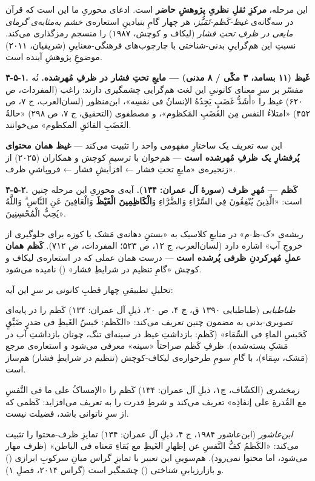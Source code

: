 \documentclass[12pt,a4paper]{article}
\begin{document}
\begin{RTL}
\begin{otherlanguage}{persian}
این مرحله، \textbf{مرکزِ ثقلِ نظریِ پژوهشِ حاضر} است. ادعای محوریِ ما این است
که قرآن در سه‌گانه‌ی \emph{غیظ-کَظم-تَمَیُّز}، هر چهار گامِ بنیادینِ استعاره‌ی
\emph{خشم به‌مثابه‌ی گرمای مایعی در ظرفِ تحتِ فشار} (لیکاف و کوچش، ۱۹۸۷) را
منسجم رمزگذاری می‌کند. نسبتِ این هم‌گراییِ بدنی-شناختی با چارچوب‌های
فرهنگی-معناییِ  (شریفیان، ۲۰۱۱) موضوعِ
پژوهشِ آینده است.

\textbf{۴-۵-۱. غَیظ (۱۱ بسامد، ۳ مکّی / ۸ مدنی) --- مایعِ تحتِ فشار در ظرفِ
مُهرشده.} نُه مفسّر بر سرِ معنای کانونیِ این لغت هم‌گرایی چشمگیری دارند: راغب
(المفردات، ص ۶۲۰) غیظ را «أَشَدُّ غَضَبٍ یَجِدُهُ الإنسانُ فی نفسِه»، ابن‌منظور
(لسان‌العرب، ج ۷، ص ۴۵۲) «امتلاءُ النفس مِن الغَضَبِ المَکظوم»، و مصطفوی
(التحقیق، ج ۷، ص ۲۹۸) «حالةُ الغَضَبِ الفائقِ المکظوم» می‌خوانند.

این سه تعریف یک ساختارِ مفهومی واحد را تثبیت می‌کند --- \textbf{غیظ همان
محتوای پُرفشارِ یک ظرفِ مُهرشده است} --- هم‌خوان با ترسیمِ کوچش و همکاران
(۲۰۲۵) از زنجیره‌ی «مایعِ تحتِ فشار ← افزایشِ فشار ← فروپاشیِ ظرف».

\textbf{۴-۵-۲. کَظم --- مُهرِ ظرف (سورۀ آل عمران: ۱۳۴).} آیه‌ی محوریِ این
مرحله چنین است: «الَّذِينَ يُنْفِقُونَ فِي السَّرَّاءِ وَالضَّرَّاءِ وَ\textbf{الْكَاظِمِينَ الْغَيْظَ}
وَالْعَافِينَ عَنِ النَّاسِ ۗ وَاللَّهُ يُحِبُّ الْمُحْسِنِينَ».

ریشه‌ی «ک-ظ-م» در منابعِ کلاسیک به «بستنِ دهانه‌ی مَشک یا کوزه برای جلوگیری
از خروجِ آب» اشاره دارد (لسان‌العرب، ج ۱۲، ص ۵۲۳؛ المفردات، ص ۷۱۲).
\textbf{کَظم همان عملِ مُهرکردنِ ظرفی پُرشده است} --- درست همان عملی که در
استعاره‌ی لیکاف و کوچش «گامِ تنظیم در شرایطِ فشار»
() نامیده می‌شود.

تحلیلِ تطبیقیِ چهار قطبِ کانونی بر سرِ این آیه:

\emph{طباطبایی} (طباطبایی ۱۳۹۰ ق، ج ۴، ص ۲۰، ذیلِ آل عمران: ۱۳۴) کَظم را
در پایه‌ای تصویری-بدنی به مضمون چنین تعریف می‌کند: «الکَظم: حَبسُ الغَیظِ فی
صَدرٍ ضَیِّقٍ کَحَبسِ الماءِ فی السِّقاء» (کَظم: بازداشتِ غیظ در سینه‌ای تنگ، چونان
بازداشتِ آب در مَشکِ بسته‌شده). ظرفِ کَظم صراحتاً «سینه» معرفی می‌شود و استعاره‌ی
مرجع (مَشک، سِقاء)، با گامِ سومِ طرحواره‌ی لیکاف-کوچش (تنظیم در شرایطِ فشار)
هم‌ساز است.

\emph{زمخشری} (الکشّاف، ج۱، ذیلِ آل عمران: ۱۳۴) کَظم را «الإمساکُ علی ما فی
النَّفسِ مع القُدرةِ علی إنفاذِه» تعریف می‌کند و شرطِ قدرت را به تعریف می‌افزاید:
کَظمی که از سرِ ناتوانی باشد، فضیلت نیست.

\emph{ابن‌عاشور} (ابن‌عاشور ۱۹۸۴، ج ۴، ذیلِ آل عمران: ۱۳۴) تمایزِ ظرف-محتوا
را تثبیت می‌کند: «الکَظمُ کفُّ النَّفسِ عن إظهارِ الغَیظِ مع بَقاءِ مَعناه فی الباطن»
(ظرف مهار می‌شود، اما محتوا نمی‌رود). هم‌سوییِ این تعبیر با تمایزِ گراس میانِ
سرکوبِ ابرازی () و بازارزیابیِ شناختی
() چشمگیر است (گراس ۲۰۱۴، فصلِ ۱).


\end{otherlanguage}
\end{RTL}
\end{document}
